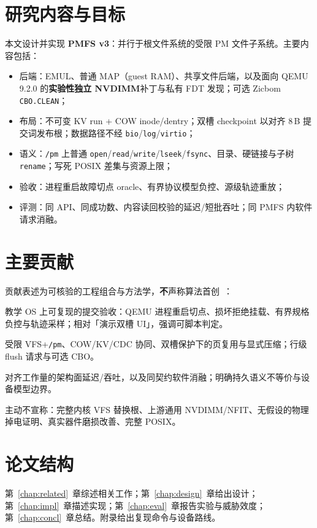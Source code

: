 \section{研究内容与目标}

本文设计并实现 \textbf{PMFS v3}：并行于根文件系统的受限 PM 文件子系统。主要内容包括：

\begin{itemize}[leftmargin=2em]
  \item 后端：EMUL、普通 MAP（guest RAM）、共享文件后端，以及面向 QEMU 9.2.0 的\textbf{实验性独立 NVDIMM}补丁与私有 FDT 发现；可选 Zicbom \texttt{CBO.CLEAN}；
  \item 布局：不可变 KV run + COW inode/dentry；双槽 checkpoint 以对齐 8\,B 提交词发布根；数据路径不经 \texttt{bio}/\texttt{log}/\texttt{virtio}；
  \item 语义：\texttt{/pm} 上普通 \texttt{open}/\texttt{read}/\texttt{write}/\texttt{lseek}/\texttt{fsync}、目录、硬链接与子树 \texttt{rename}；写死 POSIX 差集与资源上限；
  \item 验收：进程重启故障切点 oracle、有界协议模型负控、源级轨迹重放；
  \item 评测：同 API、同成功数、内容读回校验的延迟/短批吞吐；同 PMFS 内软件请求消融。
\end{itemize}

\section{主要贡献}

贡献表述为可核验的工程组合与方法学，\textbf{不}声称算法首创~\cite{fcsown,auroraown,cxcos}：

\begin{description}[leftmargin=2em,style=nextline]
  \item[C1 方法学] 教学 OS 上可复现的提交验收：QEMU 进程重启切点、损坏拒绝挂载、有界规格负控与轨迹采样；相对「演示双槽 UI」，强调可脚本判定。
  \item[C2 系统] 受限 VFS+\texttt{/pm}、COW/KV/CDC 协同、双槽保护下的页复用与显式压缩；行级 flush 请求与可选 CBO。
  \item[C3 实验] 对齐工作量的架构面延迟/吞吐，以及同契约软件消融；明确持久语义不等价与设备模型边界。
\end{description}

主动不宣称：完整内核 VFS 替换根、上游通用 NVDIMM/NFIT、无假设的物理掉电证明、真实器件磨损改善、完整 POSIX。

\section{论文结构}

第~\ref{chap:related}~章综述相关工作；第~\ref{chap:design}~章给出设计；第~\ref{chap:impl}~章描述实现；第~\ref{chap:eval}~章报告实验与威胁效度；第~\ref{chap:concl}~章总结。附录给出复现命令与设备路线。
